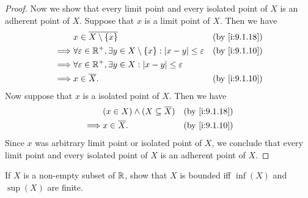 \begin{proof}
  Now we show that every limit point and every isolated point of \(X\) is an adherent point of \(X\).
  Suppose that \(x\) is a limit point of \(X\).
  Then we have
  \begin{align*}
             & x \in \overline{X \setminus \set{x}}                                                           &  & \by{i:9.1.18} \\
    \implies & \forall \varepsilon \in \R^+, \exists y \in X \setminus \set{x} : \abs{x - y} \leq \varepsilon &  & \by{i:9.1.10} \\
    \implies & \forall \varepsilon \in \R^+, \exists y \in X : \abs{x - y} \leq \varepsilon                                      \\
    \implies & x \in \overline{X}.                                                                            &  & \by{i:9.1.10}
  \end{align*}
  Now suppose that \(x\) is a isolated point of \(X\).
  Then we have
  \begin{align*}
             & (x \in X) \land (X \subseteq \overline{X}) &  & \by{i:9.1.18} \\
    \implies & x \in \overline{X}.                        &  & \by{i:9.1.10}
  \end{align*}
  Since \(x\) was arbitrary limit point or isolated point of \(X\), we conclude that every limit point and every isolated point of \(X\) is an adherent point of \(X\).
\end{proof}

\begin{ex}\label{i:ex:9.1.10}
  If \(X\) is a non-empty subset of \(\mathbb{R}\), show that \(X\) is bounded iff \(\inf(X)\) and \(\sup(X)\) are finite.
\end{ex}

